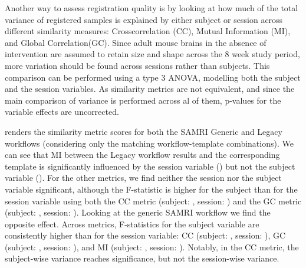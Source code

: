 Another way to assess registration quality is by looking at how much of the total variance of registered samples is explained by either subject or session across different similarity measures:
Crosscorrelation (CC), Mutual Information (MI), and Global Correlation(GC).
Since adult mouse brains in the absence of intervention are assumed to retain size and shape across the 8 week study period, more variation should be found across sessions rather than subjects.
This comparison can be performed using a type 3 ANOVA, modelling both the subject and the session variables.
As similarity metrics are not equivalent, and since the main comparison of variance is performed across al of them, p-values for the variable effects are uncorrected.

 renders the similarity metric scores for both the SAMRI Generic and Legacy workflows (considering only the matching workflow-template combinations).
We can see that MI between the Legacy workflow results and the corresponding template is significantly influenced by the session variable () but not the subject variable ().
For the other metrics, we find neither the session nor the subject variable significant, although the F-statistic is higher for the subject than for the session variable using both
the CC metric (subject: , session: )
and the GC metric (subject: , session: ).
Looking at the generic SAMRI workflow we find the opposite effect.
Across metrics, F-statistics for the subject variable are consistently higher than for the session variable:
CC (subject: , session: ),
GC (subject: , session: ),
and MI (subject: , session: ).
Notably, in the CC metric, the subject-wise variance reaches significance, but not the session-wise variance.



